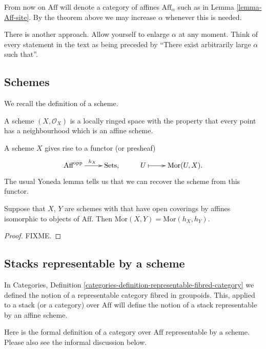 \noindent
From now on $\text{Aff}$ will denote a category of affines $\text{Aff}_\alpha$
such as in Lemma \ref{lemma-Aff-site}. By the theorem above we may increase
$\alpha$ whenever this is needed.

\begin{remark}
\label{remark-other-approach}
There is another approach. Allow yourself to enlarge $\alpha$ at any moment.
Think of every statement in the text as being preceded by ``There exist
arbitrarily large $\alpha$ such that''. 
\end{remark}

\subsection{Schemes}
\label{subsection-schemes}

\noindent
We recall the definition of a scheme.

\smallskip\noindent
A scheme $(X,\mathcal{O}_X)$ is a locally ringed space
with the property that every point has a neighbourhood which is an
affine scheme.

\smallskip\noindent
A scheme $X$ gives rise to a functor (or presheaf)
$$
\xymatrix{
\text{Aff}^{\text{opp}} \ar[r]^{h_X} & \text{Sets}, &
U \ar@{|->}[r] & \text{Mor}(U, X).}
$$
The usual Yoneda lemma tells us that we can recover the scheme from this
functor. 

\begin{lemma}
\label{lemma-yoneda-schemes}
Suppose that $X$, $Y$ are schemes with that have open coverings
by affines isomorphic to objects of $\text{Aff}$. Then $\text{Mor}(X,Y)
= \text{Mor}(h_X, h_Y)$.
\end{lemma}

\begin{proof}
FIXME.
\end{proof}

\subsection{Stacks representable by a scheme}
\label{subsection-stack-representable-by-scheme}

\noindent
In Categories, Definition
\ref{categories-definition-representable-fibred-category} we
defined the notion of a representable category fibred in groupoids. This,
applied to a stack (or a category) over $\text{Aff}$ will define the notion of
a stack representable by an affine scheme. 

\smallskip\noindent
Here is the formal definition of a category over $\text{Aff}$ representable by
a scheme. Please also see the informal discussion below.

